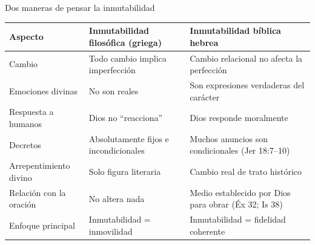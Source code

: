 \begin{frame}{Dos maneras de pensar la inmutabilidad}
\scriptsize\renewcommand{\arraystretch}{1.13}
\begin{tabular}{@{}>{\RaggedRight\arraybackslash}p{2.3cm}>{\RaggedRight\arraybackslash}p{4.5cm}>{\RaggedRight\arraybackslash}p{5.0cm}@{}}
\toprule
\textbf{Aspecto} & \textbf{Inmutabilidad filosófica (griega)} & \textbf{Inmutabilidad bíblica hebrea} \\ \midrule
Cambio & Todo cambio implica imperfección & Cambio relacional no afecta la perfección \\
Emociones divinas & No son reales & Son expresiones verdaderas del carácter \\
Respuesta a humanos & Dios no ``reacciona'' & Dios responde moralmente \\
Decretos & Absolutamente fijos e incondicionales & Muchos anuncios son condicionales (Jer 18:7--10) \\
Arrepentimiento divino & Solo figura literaria & Cambio real de trato histórico \\
Relación con la oración & No altera nada & Medio establecido por Dios para obrar (Éx 32; Is 38) \\
Enfoque principal & Inmutabilidad = inmovilidad & Inmutabilidad = fidelidad coherente \\
\bottomrule
\end{tabular}\par\smallskip
{}
\end{frame}

